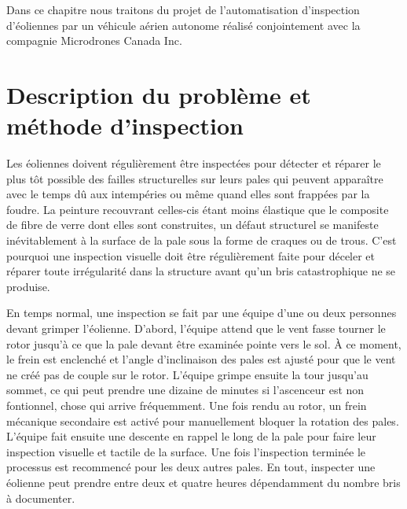 \label{sec:uav}

Dans ce chapitre nous traitons du projet de l'automatisation d'inspection d'éoliennes par un véhicule aérien autonome réalisé conjointement avec la compagnie Microdrones Canada Inc.

\section{Description du problème et méthode d'inspection}

Les éoliennes doivent régulièrement être inspectées pour détecter et réparer le plus tôt possible des failles structurelles sur leurs pales qui peuvent apparaître avec le temps dû aux intempéries ou même quand elles sont frappées par la foudre. La peinture recouvrant celles-cis étant moins élastique que le composite de fibre de verre dont elles sont construites, un défaut structurel se manifeste inévitablement à la surface de la pale sous la forme de craques ou de trous. C'est pourquoi une inspection visuelle doit être régulièrement faite pour déceler et réparer toute irrégularité dans la structure avant qu'un bris catastrophique ne se produise.

En temps normal, une inspection se fait par une équipe d'une ou deux personnes devant grimper l'éolienne. D'abord, l'équipe attend que le vent fasse tourner le rotor jusqu'à ce que la pale devant être examinée pointe vers le sol. À ce moment, le frein est enclenché et l'angle d'inclinaison des pales est ajusté pour que le vent ne créé pas de couple sur le rotor. L'équipe grimpe ensuite la tour jusqu'au sommet, ce qui peut prendre une dizaine de minutes si l'ascenceur est non fontionnel, chose qui arrive fréquemment. Une fois rendu au rotor, un frein mécanique secondaire est activé pour manuellement bloquer la rotation des pales. L'équipe fait ensuite une descente en rappel le long de la pale pour faire leur inspection visuelle et tactile de la surface. Une fois l'inspection terminée le processus est recommencé pour les deux autres pales. En tout, inspecter une éolienne peut prendre entre deux et quatre heures dépendamment du nombre bris à documenter.


